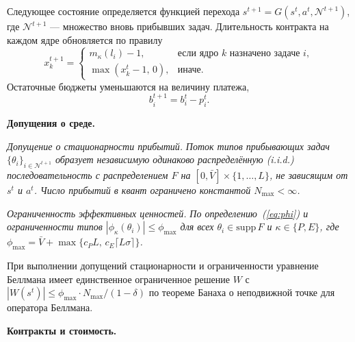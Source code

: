 \documentclass[14pt, oneside]{extbook}
\begin{document}
        Следующее состояние определяется функцией перехода
        $s^{t+1} = G(s^t, a^t, \mathcal{N}^{t+1})$, где
        $\mathcal{N}^{t+1}$ --- множество вновь прибывших задач.
        Длительность контракта на каждом ядре обновляется по
        правилу
        \begin{equation*}
                x_k^{t+1} = \begin{cases}
                        m_\kappa(l_i) - 1, & \text{если ядро } k
                                \text{ назначено задаче } i, \\
                        \max(x_k^t - 1,\, 0), & \text{иначе}.
                \end{cases}
        \end{equation*}
        Остаточные бюджеты уменьшаются на величину платежа,
        \begin{equation*}
                b_i^{t+1} = b_i^t - p_i^t.
        \end{equation*}


\textbf{Допущения о среде.}

        \textit{Допущение о стационарности прибытий.}
        \textit{Поток типов прибывающих задач
        $\{\theta_i\}_{i \in \mathcal{N}^{t+1}}$ образует
        независимую одинаково распределённую (i.i.d.)
        последовательность с распределением $F$ на
        $[0, \bar V] \times \{1, \ldots, L\}$, не зависящим
        от $s^t$ и $a^t$. Число прибытий в квант ограничено
        константой $N_{\max} < \infty$.}

        \textit{Ограниченность эффективных ценностей.}
        \textit{По определению~(\ref{eq:phi}) и ограниченности
        типов $|\phi_\kappa(\theta_i)| \leq \phi_{\max}$ для
        всех $\theta_i \in \mathrm{supp}\,F$ и
        $\kappa \in \{P, E\}$, где
        $\phi_{\max} = \bar V +
        \max\{c_P L,\, c_E \lceil L\sigma \rceil\}$.}

        При выполнении допущений стационарности и
        ограниченности уравнение Беллмана имеет единственное
        ограниченное решение $W$ с
        $|W(s^t)| \leq \phi_{\max} \cdot N_{\max} / (1 - \delta)$
        по теореме Банаха о неподвижной точке для оператора
        Беллмана.


\textbf{Контракты и стоимость.}
\end{document}
